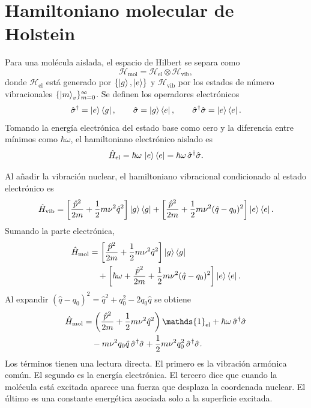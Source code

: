 \documentclass[11pt]{article}
\newcommand{\sigmad}{\hat\sigma^\dagger}
\begin{document}
\section{Hamiltoniano molecular de Holstein}

Para una mol\'ecula aislada, el espacio de Hilbert se separa como
\begin{equation}
  \mathcal H_{\mathrm{mol}}
  =
  \mathcal H_{\mathrm{el}}\otimes\mathcal H_{\mathrm{vib}},
\end{equation}
donde $\mathcal H_{\mathrm{el}}$ est\'a generado por $\{\ket{g},\ket{e}\}$ y
$\mathcal H_{\mathrm{vib}}$ por los estados de n\'umero vibracionales
$\{\ket{m}_v\}_{m=0}^{\infty}$. Se definen los operadores electr\'onicos
\begin{equation}
  \sigmad=\ket{e}\bra{g},
  \qquad
  \hat\sigma=\ket{g}\bra{e},
  \qquad
  \sigmad\hat\sigma=\ket{e}\bra{e}.
\end{equation}
Tomando la energ\'ia electr\'onica del estado base como cero y la diferencia
entre m\'inimos como $\hbar\omega$, el hamiltoniano electr\'onico aislado es
\begin{equation}
  \hat H_{\mathrm{el}}
  =
  \hbar\omega\,\ket{e}\bra{e}
  =
  \hbar\omega\,\sigmad\hat\sigma.
\end{equation}

Al a\~nadir la vibraci\'on nuclear, el hamiltoniano vibracional condicionado
al estado electr\'onico es
\begin{equation}
  \hat H_{\mathrm{vib}}
  =
  \left[
  \frac{\hat p^2}{2m}
  +
  \frac{1}{2}m\nu^2\hat q^2
  \right]\ket{g}\bra{g}
  +
  \left[
  \frac{\hat p^2}{2m}
  +
  \frac{1}{2}m\nu^2(\hat q-q_0)^2
  \right]\ket{e}\bra{e}.
\end{equation}
Sumando la parte electr\'onica,
\begin{align}
  \hat H_{\mathrm{mol}}
  &=
  \left[
  \frac{\hat p^2}{2m}
  +
  \frac{1}{2}m\nu^2\hat q^2
  \right]\ket{g}\bra{g}
  \notag\\
  &\quad+
  \left[
  \hbar\omega
  +
  \frac{\hat p^2}{2m}
  +
  \frac{1}{2}m\nu^2(\hat q-q_0)^2
  \right]\ket{e}\bra{e}.
\end{align}
Al expandir $(\hat q-q_0)^2=\hat q^2+q_0^2-2q_0\hat q$ se obtiene
\begin{align}
  \hat H_{\mathrm{mol}}
  &=
  \left(
  \frac{\hat p^2}{2m}
  +
  \frac{1}{2}m\nu^2\hat q^2
  \right)\mathds{1}_{\mathrm{el}}
  +
  \hbar\omega\,\sigmad\hat\sigma
  \notag\\
  &\quad
  -m\nu^2q_0\hat q\,\sigmad\hat\sigma
  +
  \frac{1}{2}m\nu^2q_0^2\,\sigmad\hat\sigma .
\end{align}
Los t\'erminos tienen una lectura directa. El primero es la vibraci\'on
arm\'onica com\'un. El segundo es la energ\'ia electr\'onica. El tercero dice
que cuando la mol\'ecula est\'a excitada aparece una fuerza que desplaza la
coordenada nuclear. El \'ultimo es una constante energ\'etica asociada solo a
la superficie excitada.
\end{document}
